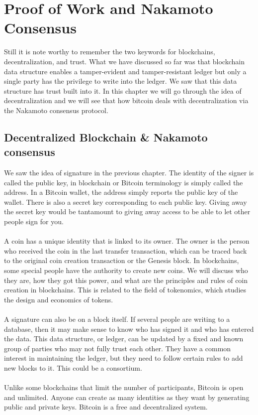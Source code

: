 \chapter{Proof of Work and Nakamoto Consensus}
Still it is note worthy to remember the two keywords for blockchains, decentralization, and trust. What we have discussed so far was that blockchain data structure enables a tamper-evident and tamper-resistant ledger but only a single party has the privilege to write into the ledger. We saw that this data structure has trust built into it. In this chapter we will go through the idea of decentralization and we will see that how bitcoin deals with decentralization via the Nakamoto consensus protocol.

\section{Decentralized Blockchain \& Nakamoto consensus}
We saw the idea of signature in the previous chapter. The identity of the signer is called the public key, in blockchain or Bitcoin terminology is simply called the address. In a Bitcoin wallet, the address simply reports the public key of the wallet. There is also a secret key corresponding to each public key. Giving away the secret key would be tantamount to giving away access to be able to let other people sign for you.\\\\
A coin has a unique identity that is linked to its owner. The owner is the person who received the coin in the last transfer transaction, which can be traced back to the original coin creation transaction or the Genesis block. In blockchains, some special people have the authority to create new coins. We will discuss who they are, how they got this power, and what are the principles and rules of coin creation in blockchains. This is related to the field of tokenomics, which studies the design and economics of tokens.\\\\
A signature can also be on a block itself.  If several people are writing to a database, then it may make sense to know who has signed it and who has entered the data. This data structure, or ledger, can be updated by a fixed and known group of parties who may not fully trust each other. They have a common interest in maintaining the ledger, but they need to follow certain rules to add new blocks to it. This could be a consortium. \\\\
Unlike some blockchains that limit the number of participants, Bitcoin is open and unlimited. Anyone can create as many identities as they want by generating public and private keys. Bitcoin is a free and decentralized system.

